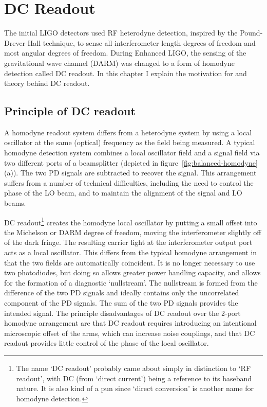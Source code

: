 \chapter{DC Readout}
\label{chapter3}

The initial LIGO detectors used RF heterodyne detection, inspired by
the Pound-Drever-Hall technique, to sense all interferometer length
degrees of freedom and most angular degrees of freedom.  During
Enhanced LIGO, the sensing of the gravitational wave channel (DARM)
was changed to a form of homodyne detection called DC readout.  In
this chapter I explain the motivation for and theory behind DC
readout.

\section{Principle of DC readout}
A homodyne readout system differs from a heterodyne system by using a
local oscillator at the same (optical) frequency as the field being
measured.  A typical homodyne detection system combines a local
oscillator field and a signal field via two different ports of a
beamsplitter (depicted in figure~\ref{fig:balanced-homodyne}(a)).  The
two PD signals are subtracted to recover the signal.  This arrangement
suffers from a number of technical
difficulties\cite{McKenzie2007Technical}, including the need to
control the phase of the LO beam, and to maintain the alignment of the
signal and LO beams.

DC readout\footnote{The name `DC readout' probably came about simply
in distinction to `RF readout', with DC (from `direct current') being a
reference to its baseband nature.  It is also
kind of a pun since `direct conversion' is another name for homodyne
detection.} creates the homodyne local oscillator by putting a small
offset into the Michelson or DARM degree of freedom, moving the
interferometer slightly off of the dark fringe.  The resulting carrier
light at the interferometer output port acts as a local oscillator.
This differs from the typical homodyne arrangement in that the two
fields are automatically coincident.  It is no longer necessary to use
two photodiodes, but doing so allows greater power handling capacity,
and allows for the formation of a diagnostic `nullstream'.  The
nullstream is formed from the difference of the two PD signals and
ideally contains only the uncorrelated component of the PD signals.
The sum of the two PD signals provides the intended signal.  The
principle disadvantages of DC readout over the 2-port homodyne
arrangement are that DC readout requires introducing an intentional
microscopic offset of the arms, which can increase noise couplings,
and that DC readout provides little control of the phase of the local
oscillator.

